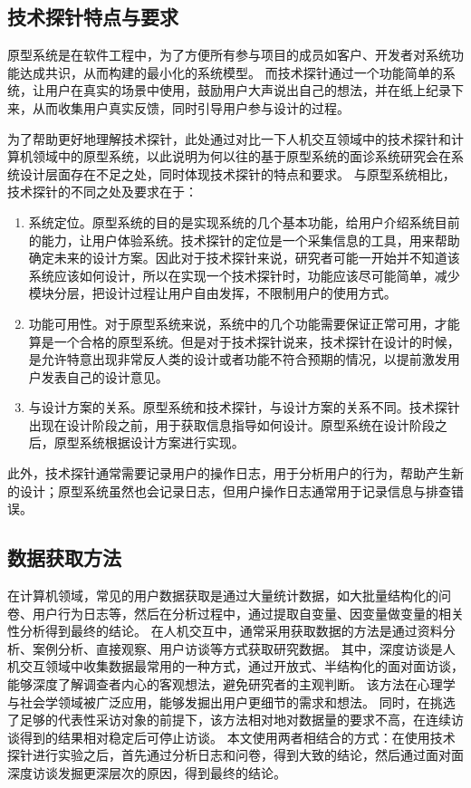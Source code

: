 \subsection{技术探针特点与要求}

原型系统是在软件工程中，为了方便所有参与项目的成员如客户、开发者对系统功能达成共识，从而构建的最小化的系统模型。
而技术探针通过一个功能简单的系统，让用户在真实的场景中使用，鼓励用户大声说出自己的想法，并在纸上纪录下来，从而收集用户真实反馈，同时引导用户参与设计的过程。

为了帮助更好地理解技术探针，此处通过对比一下人机交互领域中的技术探针和计算机领域中的原型系统，以此说明为何以往的基于原型系统的面诊系统研究会在系统设计层面存在不足之处，同时体现技术探针的特点和要求。
与原型系统相比，技术探针的不同之处及要求在于：
\begin{enumerate}
    \item 系统定位。原型系统的目的是实现系统的几个基本功能，给用户介绍系统目前的能力，让用户体验系统。技术探针的定位是一个采集信息的工具，用来帮助确定未来的设计方案。因此对于技术探针来说，研究者可能一开始并不知道该系统应该如何设计，所以在实现一个技术探针时，功能应该尽可能简单，减少模块分层，把设计过程让用户自由发挥，不限制用户的使用方式。

    \item 功能可用性。对于原型系统来说，系统中的几个功能需要保证正常可用，才能算是一个合格的原型系统。但是对于技术探针说来，技术探针在设计的时候，是允许特意出现非常反人类的设计或者功能不符合预期的情况，以提前激发用户发表自己的设计意见。

    \item 与设计方案的关系。原型系统和技术探针，与设计方案的关系不同。技术探针出现在设计阶段之前，用于获取信息指导如何设计。原型系统在设计阶段之后，原型系统根据设计方案进行实现。
\end{enumerate}

此外，技术探针通常需要记录用户的操作日志，用于分析用户的行为，帮助产生新的设计；原型系统虽然也会记录日志，但用户操作日志通常用于记录信息与排查错误。

\subsection{数据获取方法}
在计算机领域，常见的用户数据获取是通过大量统计数据，如大批量结构化的问卷、用户行为日志等，然后在分析过程中，通过提取自变量、因变量做变量的相关性分析得到最终的结论。
在人机交互中，通常采用获取数据的方法是通过资料分析、案例分析、直接观察、用户访谈等方式获取研究数据。
其中，深度访谈是人机交互领域中收集数据最常用的一种方式，通过开放式、半结构化的面对面访谈，能够深度了解调查者内心的客观想法，避免研究者的主观判断。
该方法在心理学与社会学领域被广泛应用，能够发掘出用户更细节的需求和想法。
同时，在挑选了足够的代表性采访对象的前提下，该方法相对地对数据量的要求不高，在连续访谈得到的结果相对稳定后可停止访谈\cite{cleary2014data}。
本文使用两者相结合的方式：在使用技术探针进行实验之后，首先通过分析日志和问卷，得到大致的结论，然后通过面对面深度访谈发掘更深层次的原因，得到最终的结论。

